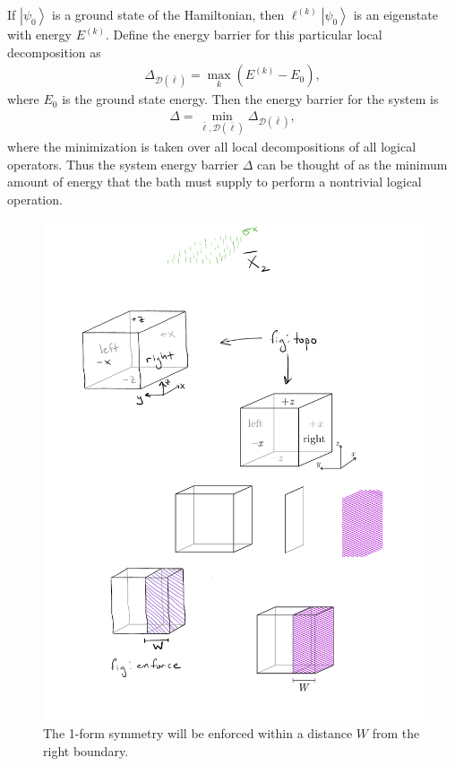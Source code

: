 \documentclass[twocolumn, longbibliography]{revtex4-2}
\renewcommand{\l}{\ell}
\newcommand{\ket}[1]{\left|#1\right\rangle}
\begin{document}
If $\ket{\psi_0}$ is a ground state of the Hamiltonian, then $\l^{(k)}\ket{\psi_0}$ is an eigenstate with energy $E^{(k)}$. Define the energy barrier for this particular local decomposition as
\begin{align}
\Delta_{\mathcal{D}(\bar{\l})}=\max_k(E^{(k)}-E_0),
\end{align}
where $E_0$ is the ground state energy. Then the energy barrier for the system is
\begin{align}
\Delta = \min_{\bar{\l},\mathcal{D}(\bar{\l})}\Delta_{\mathcal{D}(\bar{\l})},
\end{align}
where the minimization is taken over all local decompositions of all logical operators. Thus the system energy barrier $\Delta$ can be thought of as the minimum amount of energy that the bath must supply to perform a nontrivial logical operation.

\begin{figure}
\centering
\includegraphics{enforce}
\caption{The 1-form symmetry will be enforced within a distance $W$ from the right boundary.}
\label{fig:enforce}
\end{figure}
\end{document}
